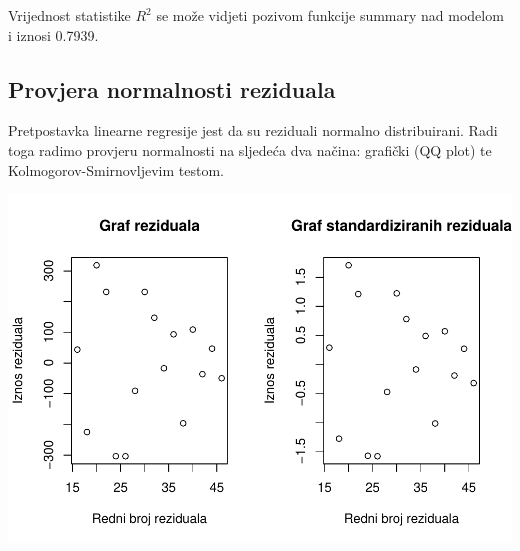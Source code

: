 \documentclass[]{article}
\newenvironment{Shaded}{\begin{snugshade}}{\end{snugshade}}
\newcommand{\KeywordTok}[1]{\textcolor[rgb]{0.13,0.29,0.53}{\textbf{{#1}}}}
\newcommand{\DataTypeTok}[1]{\textcolor[rgb]{0.13,0.29,0.53}{{#1}}}
\newcommand{\DecValTok}[1]{\textcolor[rgb]{0.00,0.00,0.81}{{#1}}}
\newcommand{\StringTok}[1]{\textcolor[rgb]{0.31,0.60,0.02}{{#1}}}
\newcommand{\NormalTok}[1]{{#1}}
\begin{document}
Vrijednost statistike \(R^2\) se može vidjeti pozivom funkcije summary
nad modelom i iznosi 0.7939.

\subsection{Provjera normalnosti
reziduala}\label{provjera-normalnosti-reziduala-1}

Pretpostavka linearne regresije jest da su reziduali normalno
distribuirani. Radi toga radimo provjeru normalnosti na sljedeća dva
načina: grafički (QQ plot) te Kolmogorov-Smirnovljevim testom.

\begin{Shaded}
\end{Shaded}

\includegraphics{Izvjestaj_files/figure-latex/unnamed-chunk-19-1.pdf}
\end{document}

